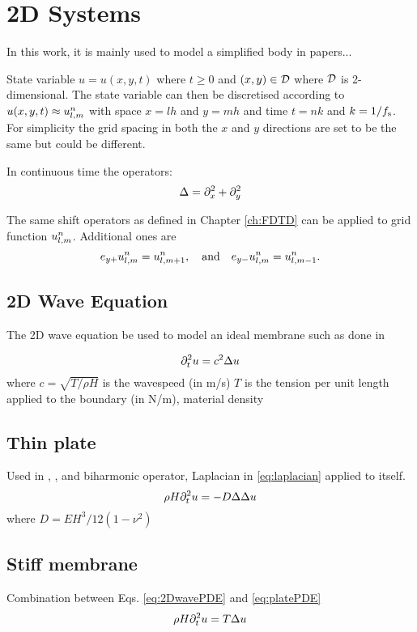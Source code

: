 \chapter{2D Systems}\label{ch:2Dsyst}


In this work, it is mainly used to model a simplified body in papers...


State variable $u = u(x,y,t)$  where $t\geq 0$ and $(x,y) \in \mathcal{D}$ where $\mathcal{D}$ is 2-dimensional. The state variable can then be discretised according to $u(x, y, t) \approx u_{l,m}^n$ with space $x = lh$ and $y = mh$ and time $t = nk$ and $k=1/f_\text{s}$. For simplicity the grid spacing in both the $x$ and $y$ directions are set to be the same but could be different.

In continuous time the  operators:
\begin{equation}
    \Delta = \partial_x^2 + \partial_y^2
\end{equation}


The same shift operators as defined in Chapter \ref{ch:FDTD} can be applied to grid function $u_{l,m}^n$. Additional ones are
\begin{equation}
    e_{y+}u_{l,m}^n = u_{l, m+1}^n,\quad \text{and}\quad e_{y-}u_{l,m}^n= u_{l, m-1}^n.
\end{equation}


\section{2D Wave Equation}
The 2D wave equation be used to model an ideal membrane such as done in 

\begin{equation}\label{eq:2DwavePDE}
    \partial_t^2 u = c^2\Delta u
\end{equation}
where $c = \sqrt{T/\rho H}$ is the wavespeed (in m/s) $T$ is the tension per unit length applied to the boundary (in N/m), material density

\section{Thin plate}
Used in \citeP[A], \citeP[B], \citeP[D] and \citeP[E]
biharmonic operator, Laplacian in \eqref{eq:laplacian} applied to itself.
\begin{equation}\label{eq:platePDE}
    \rho H \partial_t^2 u = -D\Delta\Delta u
\end{equation}
where $D = EH^3/12(1-\nu^2)$
\section{Stiff membrane}
Combination between Eqs. \eqref{eq:2DwavePDE} and \eqref{eq:platePDE}
\begin{equation}\label{eq:2DwavePDE}
    \rho H \partial_t^2 u = T\Delta u
\end{equation}
\citeP[F]
